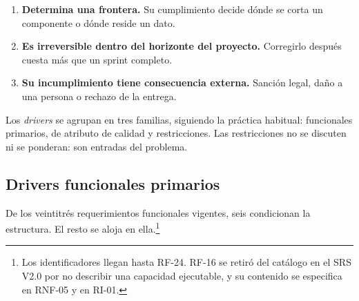 \documentclass[11pt,a4paper]{article}
\begin{document}
\begin{enumerate}
\item \textbf{Determina una frontera.} Su cumplimiento decide dónde se corta un componente o dónde reside un dato.
\item \textbf{Es irreversible dentro del horizonte del proyecto.} Corregirlo después cuesta más que un sprint completo.
\item \textbf{Su incumplimiento tiene consecuencia externa.} Sanción legal, daño a una persona o rechazo de la entrega.
\end{enumerate}

Los \emph{drivers} se agrupan en tres familias, siguiendo la práctica habitual: funcionales primarios, de atributo de calidad y restricciones. Las restricciones no se discuten ni se ponderan: son entradas del problema.

\subsection{Drivers funcionales primarios}

De los veintitrés requerimientos funcionales vigentes, seis condicionan la estructura. El resto se aloja en ella.\footnote{Los identificadores llegan hasta RF-24. RF-16 se retiró del catálogo en el SRS V2.0 por no describir una capacidad ejecutable, y su contenido se especifica en RNF-05 y en RI-01.}
\end{document}

